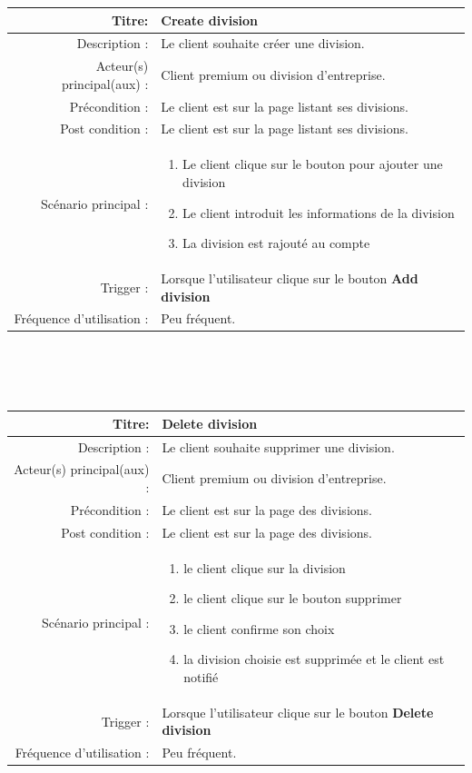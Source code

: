 \documentclass{report}
\begin{document}
\begin{tabular}{|r|p{9cm}|}
    \hline
    Titre: & Create division \\
    \hline
    Description : & Le client souhaite créer une division. \\
    \hline
    Acteur(s) principal(aux) : & Client premium ou division d'entreprise. \\
    \hline
    Précondition : & Le client est sur la page listant ses divisions. \\
    \hline
    Post condition : & Le client est sur la page listant ses divisions. \\
    \hline
    Scénario principal : & \begin{enumerate}[left=0pt, topsep=0pt]
        \item Le client clique sur le bouton pour ajouter une division
        \item Le client introduit les informations de la division
        \item La division est rajouté au  compte 
    \end{enumerate} \nointerlineskip\\
    \hline
    Trigger : & Lorsque l'utilisateur clique sur le bouton \textbf{Add division} \\ 
    \hline
    Fréquence d'utilisation : & Peu fréquent. \\
    \hline
\end{tabular}
\\\\\\
\begin{tabular}{|r|p{9cm}|}
    \hline
    Titre: & Delete division \\
    \hline
    Description : & Le client souhaite supprimer une division. \\
    \hline
    Acteur(s) principal(aux) : & Client premium ou division d'entreprise. \\
    \hline
    Précondition : & Le client est sur la page des divisions. \\
    \hline
    Post condition : & Le client est sur la page des divisions. \\
    \hline
    Scénario principal : & \begin{enumerate}[left=0pt, topsep=0pt]
        \item le client clique sur la division
        \item le client clique sur le bouton supprimer
        \item le client confirme son choix
        \item la division choisie est supprimée et le client est notifié 
    \end{enumerate} \nointerlineskip\\
    \hline
    Trigger : & Lorsque l'utilisateur clique sur le bouton \textbf{Delete division} \\ 
    \hline
    Fréquence d'utilisation : & Peu fréquent. \\
    \hline
\end{tabular}
\end{document}
